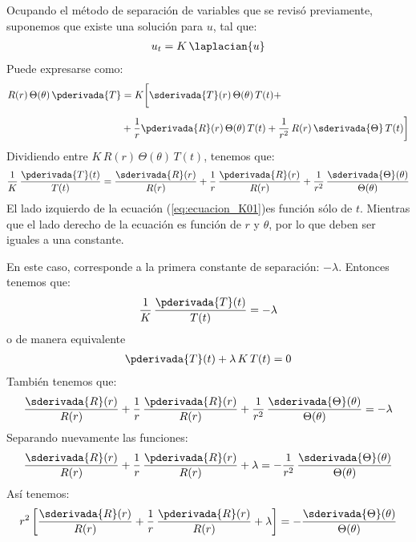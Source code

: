 Ocupando el método de separación de variables que se revisó previamente, suponemos que existe una solución para $u$, tal que:
\begin{align*}
u_{t} = K \, \laplacian{u}
\end{align*}
Puede expresarse como:
\begin{align*}
R (r) \, \Theta (\theta) \, \pderivada{T} &= K \bigg[ \sderivada{T} (r) \, \Theta (\theta) \, T (t) + \\[0.5em]
&+ \dfrac{1}{r} \pderivada{R} (r) \, \Theta(\theta) \, T (t) + \dfrac{1}{r^{2}} \, R (r) \, \sderivada{\Theta} \, T (t) \bigg]
\end{align*}
Dividiendo entre $K \, R (r) \, \Theta (\theta) \, T (t)$, tenemos que:
\begin{align}
\dfrac{1}{K} \, \dfrac{\pderivada{T} (t)}{T (t)} = \dfrac{\sderivada{R} (r)}{R (r)} + \dfrac{1}{r} \, \dfrac{\pderivada{R} (r)}{R (r)} + \dfrac{1}{r^{2}} \, \dfrac{\sderivada{\Theta} (\theta)}{\Theta (\theta)}
\label{eq:ecuacion_K01}
\end{align}
El lado izquierdo de la ecuación (\ref{eq:ecuacion_K01})es función sólo de $t$. Mientras que el lado derecho de la ecuación es función de $r$ y $\theta$, por lo que deben ser iguales a una constante.
\par
En este caso, corresponde a la primera constante de separación: $- \lambda$. Entonces tenemos que:
\begin{align*}
\dfrac{1}{K} \, \dfrac{\pderivada{T} (t)}{T (t)} = - \lambda
\end{align*}
o de manera equivalente
\begin{align}
\pderivada{T} (t) + \lambda \, K \, T (t) = 0
\label{eq:ecuacion_K02}    
\end{align}
También tenemos que:
\begin{align*}
\dfrac{\sderivada{R} (r)}{R (r)} + \dfrac{1}{r} \, \dfrac{\pderivada{R} (r)}{R (r)} + \dfrac{1}{r^{2}} \, \dfrac{\sderivada{\Theta} (\theta)}{\Theta (\theta)} = - \lambda
\end{align*}
Separando nuevamente las funciones:
\begin{align*}
\dfrac{\sderivada{R} (r)}{R (r)} + \dfrac{1}{r} \, \dfrac{\pderivada{R} (r)}{R (r)} + \lambda = - \dfrac{1}{r^{2}} \, \dfrac{\sderivada{\Theta} (\theta)}{\Theta (\theta)}
\end{align*}
Así tenemos:
\begin{align}
r^{2} \left[ \dfrac{\sderivada{R} (r)}{R (r)} + \dfrac{1}{r} \, \dfrac{\pderivada{R} (r)}{R (r)} + \lambda \right] = - \dfrac{\sderivada{\Theta} (\theta)}{\Theta (\theta)}
\label{eq:ecuacion_K03}    
\end{align}

